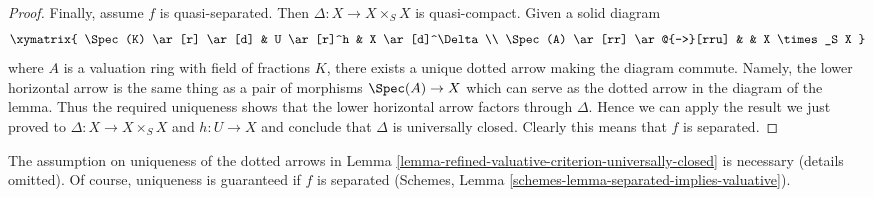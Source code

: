 \begin{proof}
\medskip\noindent
Finally, assume $f$ is quasi-separated. Then $\Delta : X \to X \times_S X$
is quasi-compact. Given a solid diagram
$$
\xymatrix{
\Spec(K) \ar[r] \ar[d] & U \ar[r]^h & X \ar[d]^\Delta \\
\Spec(A) \ar[rr] \ar@{-->}[rru] & & X \times_S X
}
$$
where $A$ is a valuation ring with field of fractions $K$, there
exists a unique dotted arrow making the diagram commute. Namely,
the lower horizontal arrow is the same thing as a pair of morphisms
$\Spec(A) \to X$ which can serve as the dotted arrow in the diagram
of the lemma. Thus the required uniqueness shows that the lower
horizontal arrow factors through $\Delta$.
Hence we can apply the result we just proved to
$\Delta : X \to X \times_S X$ and $h : U \to X$ and conclude that
$\Delta$ is universally closed. Clearly this means that $f$
is separated.
\end{proof}

\begin{remark}
\label{remark-check-val-on-open}
The assumption on uniqueness of the dotted arrows in
Lemma \ref{lemma-refined-valuative-criterion-universally-closed}
is necessary (details omitted). Of course, uniqueness is guaranteed if
$f$ is separated
(Schemes, Lemma \ref{schemes-lemma-separated-implies-valuative}).
\end{remark}

